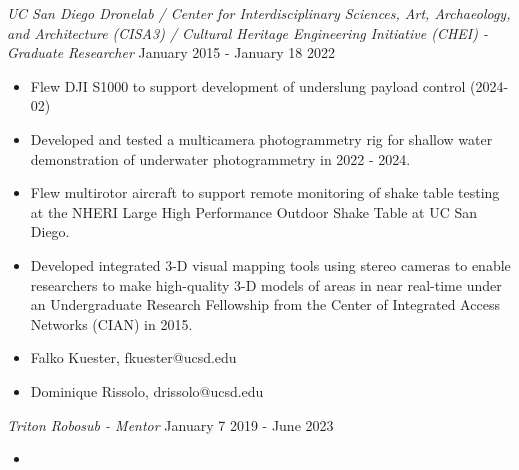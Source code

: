 \documentclass[line,margin]{res}
\begin{document}
\begin{resume}
	{\sl UC San Diego Dronelab / Center for Interdisciplinary Sciences, Art, Archaeology, and Architecture (CISA3) / Cultural Heritage Engineering Initiative (CHEI) - Graduate Researcher} \hfill January 2015 - January 18 2022
	\begin{itemize}
		\item Flew DJI S1000 to support development of underslung payload control (2024-02)
		\item Developed and tested a multicamera photogrammetry rig for shallow water demonstration of underwater photogrammetry in 2022 - 2024.
		\item Flew multirotor aircraft to support remote monitoring of shake table testing at the NHERI Large High Performance Outdoor Shake Table at UC San Diego.
		\item Developed integrated 3-D visual mapping tools using stereo cameras to enable researchers to make high-quality 3-D models of areas in near real-time under an Undergraduate Research Fellowship from the Center of Integrated Access Networks (CIAN) in 2015.
		\item Falko Kuester, fkuester@ucsd.edu
		\item Dominique Rissolo, drissolo@ucsd.edu
	\end{itemize}
	
	{\sl Triton Robosub - Mentor} \hfill January 7 2019 - June 2023
	\begin{itemize}
		\item 
	\end{itemize}


\end{resume}
\end{document}
